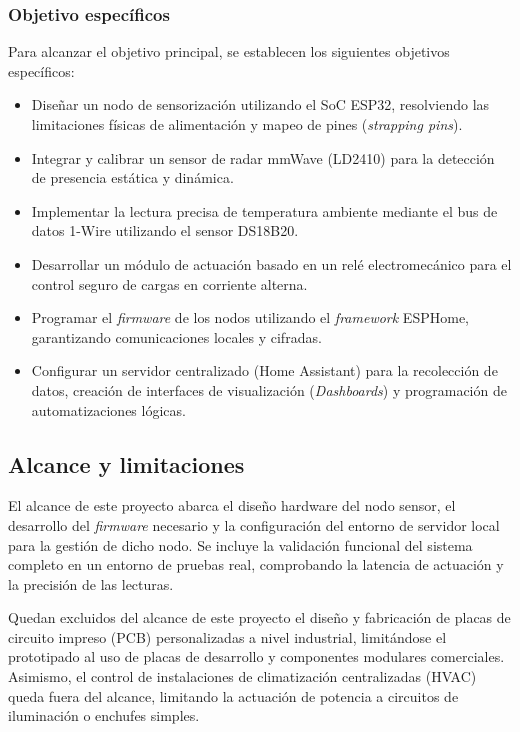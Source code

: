 \subsubsection{Objetivo específicos}
Para alcanzar el objetivo principal, se establecen los siguientes objetivos específicos:
\begin{itemize}
    \item Diseñar un nodo de sensorización utilizando el SoC ESP32, resolviendo las limitaciones físicas de alimentación y mapeo de pines (\textit{strapping pins}).
    \item Integrar y calibrar un sensor de radar mmWave (LD2410) para la detección de presencia estática y dinámica.
    \item Implementar la lectura precisa de temperatura ambiente mediante el bus de datos 1-Wire utilizando el sensor DS18B20.
    \item Desarrollar un módulo de actuación basado en un relé electromecánico para el control seguro de cargas en corriente alterna.
    \item Programar el \textit{firmware} de los nodos utilizando el \textit{framework} ESPHome, garantizando comunicaciones locales y cifradas.
    \item Configurar un servidor centralizado (Home Assistant) para la recolección de datos, creación de interfaces de visualización (\textit{Dashboards}) y programación de automatizaciones lógicas.
\end{itemize}

\subsection{Alcance y limitaciones}
El alcance de este proyecto abarca el diseño hardware del nodo sensor, el desarrollo del \textit{firmware} necesario y la configuración del entorno de servidor local para la gestión de dicho nodo. Se incluye la validación funcional del sistema completo en un entorno de pruebas real, comprobando la latencia de actuación y la precisión de las lecturas.

Quedan excluidos del alcance de este proyecto el diseño y fabricación de placas de circuito impreso (PCB) personalizadas a nivel industrial, limitándose el prototipado al uso de placas de desarrollo y componentes modulares comerciales. Asimismo, el control de instalaciones de climatización centralizadas (HVAC) queda fuera del alcance, limitando la actuación de potencia a circuitos de iluminación o enchufes simples.

